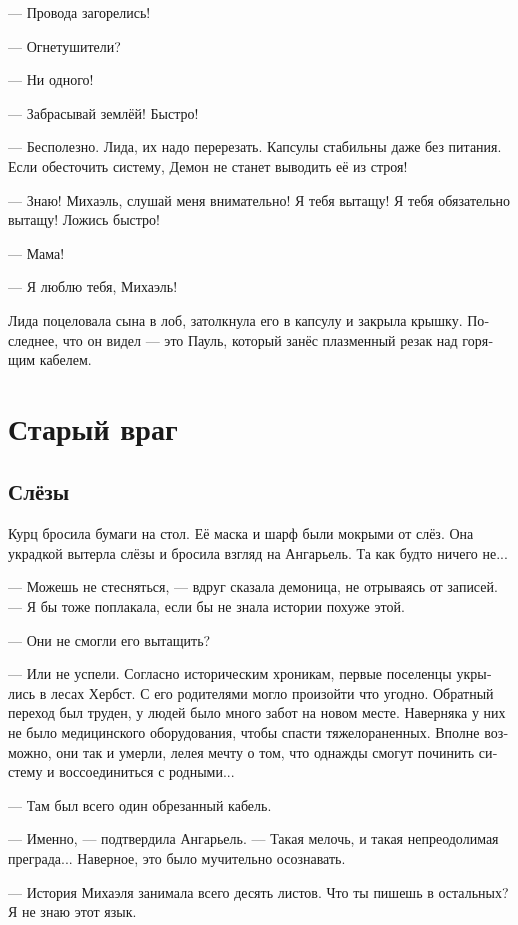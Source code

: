 \documentclass[a4paper,12pt,fleqn]{book}\usepackage{cooltooltips}\usepackage{polyglossia}\setdefaultlanguage[babelshorthands=true]{russian}\setotherlanguage{english}\defaultfontfeatures{Ligatures=TeX,Mapping=tex-text} \usepackage{xcolor}\definecolor{lightgray}{HTML}{bbbbbb}\color{lightgray}\newcommand{\ml}[3]{\textenglish{\textcolor{black}{#3}}}
\begin{document}
--- Провода загорелись!

--- Огнетушители?

--- Ни одного!

--- Забрасывай землёй!
Быстро!

--- Бесполезно.
Лида, их надо перерезать.
Капсулы стабильны даже без питания.
Если обесточить систему, Демон не станет выводить её из строя!

--- Знаю!
Михаэль, слушай меня внимательно!
Я тебя вытащу!
Я тебя обязательно вытащу!
Ложись быстро!

--- Мама!

--- Я люблю тебя, Михаэль!

Лида поцеловала сына в лоб, затолкнула его в капсулу и закрыла крышку.
Последнее, что он видел --- это Пауль, который занёс плазменный резак над горящим кабелем.

\chapter{Старый враг}

\section{Слёзы}

Курц бросила бумаги на стол.
Её маска и шарф были мокрыми от слёз.
Она украдкой вытерла слёзы и бросила взгляд на Ангарьель.
Та как будто ничего не...

--- Можешь не стесняться, --- вдруг сказала демоница, не отрываясь от записей.
--- Я бы тоже поплакала, если бы не знала истории похуже этой.

--- Они не смогли его вытащить?

--- Или не успели.
Согласно историческим хроникам, первые поселенцы укрылись в лесах Хербст.
С его родителями могло произойти что угодно.
Обратный переход был труден, у людей было много забот на новом месте.
Наверняка у них не было медицинского оборудования, чтобы спасти тяжелораненных.
Вполне возможно, они так и умерли, лелея мечту о том, что однажды смогут починить систему и воссоединиться с родными...

--- Там был всего один обрезанный кабель.

--- Именно, --- подтвердила Ангарьель.
--- Такая мелочь, и такая непреодолимая преграда...
Наверное, это было мучительно осознавать.

--- История Михаэля занимала всего десять листов.
Что ты пишешь в остальных?
Я не знаю этот язык.
\end{document}
